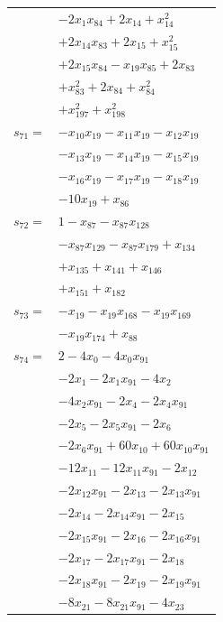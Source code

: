 \begin{longtable}{@{}r@{\;}l@{}}
 & \(\displaystyle -2x_{1}x_{84} +2x_{14} +x_{14}^{2}\) \\
 & \(\displaystyle +2x_{14}x_{83} +2x_{15} +x_{15}^{2}\) \\
 & \(\displaystyle +2x_{15}x_{84} -x_{19}x_{85} +2x_{83}\) \\
 & \(\displaystyle +x_{83}^{2} +2x_{84} +x_{84}^{2}\) \\
 & \(\displaystyle +x_{197}^{2} +x_{198}^{2}\) \\[3pt]
\(s_{71}=\) & \(\displaystyle -x_{10}x_{19} -x_{11}x_{19} -x_{12}x_{19}\) \\
 & \(\displaystyle -x_{13}x_{19} -x_{14}x_{19} -x_{15}x_{19}\) \\
 & \(\displaystyle -x_{16}x_{19} -x_{17}x_{19} -x_{18}x_{19}\) \\
 & \(\displaystyle -10x_{19} +x_{86}\) \\[3pt]
\(s_{72}=\) & \(\displaystyle 1 -x_{87} -x_{87}x_{128}\) \\
 & \(\displaystyle -x_{87}x_{129} -x_{87}x_{179} +x_{134}\) \\
 & \(\displaystyle +x_{135} +x_{141} +x_{146}\) \\
 & \(\displaystyle +x_{151} +x_{182}\) \\[3pt]
\(s_{73}=\) & \(\displaystyle -x_{19} -x_{19}x_{168} -x_{19}x_{169}\) \\
 & \(\displaystyle -x_{19}x_{174} +x_{88}\) \\[3pt]
\(s_{74}=\) & \(\displaystyle 2 -4x_{0} -4x_{0}x_{91}\) \\
 & \(\displaystyle -2x_{1} -2x_{1}x_{91} -4x_{2}\) \\
 & \(\displaystyle -4x_{2}x_{91} -2x_{4} -2x_{4}x_{91}\) \\
 & \(\displaystyle -2x_{5} -2x_{5}x_{91} -2x_{6}\) \\
 & \(\displaystyle -2x_{6}x_{91} +60x_{10} +60x_{10}x_{91}\) \\
 & \(\displaystyle -12x_{11} -12x_{11}x_{91} -2x_{12}\) \\
 & \(\displaystyle -2x_{12}x_{91} -2x_{13} -2x_{13}x_{91}\) \\
 & \(\displaystyle -2x_{14} -2x_{14}x_{91} -2x_{15}\) \\
 & \(\displaystyle -2x_{15}x_{91} -2x_{16} -2x_{16}x_{91}\) \\
 & \(\displaystyle -2x_{17} -2x_{17}x_{91} -2x_{18}\) \\
 & \(\displaystyle -2x_{18}x_{91} -2x_{19} -2x_{19}x_{91}\) \\
 & \(\displaystyle -8x_{21} -8x_{21}x_{91} -4x_{23}\) \\

\end{longtable}
